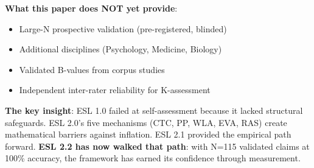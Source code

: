 \documentclass[11pt,a4paper]{article}
\begin{document}
\textbf{What this paper does NOT yet provide}:
\begin{itemize}
    \item Large-N prospective validation (pre-registered, blinded)
    \item Additional disciplines (Psychology, Medicine, Biology)
    \item Validated B-values from corpus studies
    \item Independent inter-rater reliability for K-assessment
\end{itemize}

\textbf{The key insight}: ESL 1.0 failed at self-assessment because it lacked structural safeguards. ESL 2.0's five mechanisms (CTC, PP, WLA, EVA, RAS) create mathematical barriers against inflation. ESL 2.1 provided the empirical path forward. \textbf{ESL 2.2 has now walked that path}: with N=115 validated claims at 100\% accuracy, the framework has earned its confidence through measurement.

\vspace{1em}
\begin{center}
\end{center}
\end{document}
